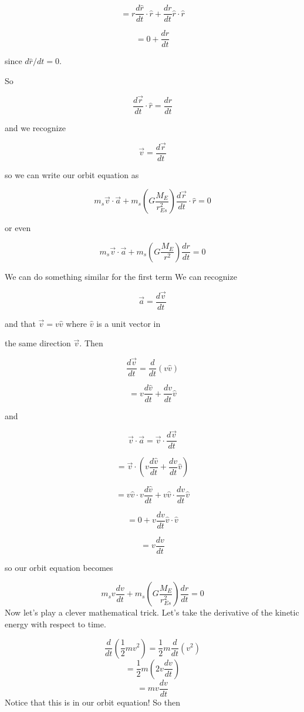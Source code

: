 $$=r\frac{d\hat{r}}{dt}\cdot \hat{r}+\frac{dr}{dt}\hat{r}\cdot \hat{r}$$%

$$=0+\frac{dr}{dt}$$%

since $d\hat{r}/dt=0.$


So 

$$\frac{d\overrightarrow{r}}{dt}\cdot \hat{r}=\frac{dr}{dt}$$

and we recognize 

$$\overrightarrow{v}=\frac{d\overrightarrow{r}}{dt}$$

so we can write our orbit equation as%

$$m_{s}\overrightarrow{v}\cdot \overrightarrow{a}+m_{s}\left( G\frac{M_{E}}{r_{Es}^{2}}\right) \frac{d\overrightarrow{r}}{dt}\cdot \hat{r}=0$$

or even 

$$m_{s}\overrightarrow{v}\cdot \overrightarrow{a}+m_{s}\left( G\frac{M_{E}}{r^{2}}\right) \frac{dr}{dt}=0$$

We can do something similar for the first term We can recognize 

$$\overrightarrow{a}=\frac{d\overrightarrow{v}}{dt}$$

and that $\overrightarrow{v}=v\hat{v}$ where $\hat{v}$ is a unit vector in

the same direction $\overrightarrow{v}.$ Then 

$$\frac{d\overrightarrow{v}}{dt}=\frac{d}{dt}\left( v\hat{v}\right) $$

$$=v\frac{d\hat{v}}{dt}+\frac{dv}{dt}\hat{v}$$

and 

$$\overrightarrow{v}\cdot \overrightarrow{a}=\overrightarrow{v}\cdot \frac{d\overrightarrow{v}}{dt}$$

$$=\overrightarrow{v}\cdot \left( v\frac{d\hat{v}}{dt}+\frac{dv}{dt}\hat{v}\right)
$$

$$=v\hat{v}\cdot v\frac{d\hat{v}}{dt}+v\hat{v}\cdot \frac{dv}{dt}\hat{v}$$

$$=0+v\frac{dv}{dt}\hat{v}\cdot \hat{v}$$

$$=v\frac{dv}{dt}$$

so our orbit equation becomes

$$m_{s}v\frac{dv}{dt}+m_{s}\left( G\frac{M_{E}}{r_{Es}^{2}}\right) \frac{dr}{dt}=0
$$
Now let's play a clever mathematical trick. Let's take the derivative of the
kinetic energy with respect to time.

$$\frac{d}{dt}\left( \frac{1}{2}mv^{2}\right) =\frac{1}{2}m\frac{d}{dt}\left(v^{2}\right) 
$$%
$$=\frac{1}{2}m\left( 2v\frac{dv}{dt}\right) 
$$%
$$=mv\frac{dv}{dt}$$%
Notice that this is in our orbit equation! So then%

